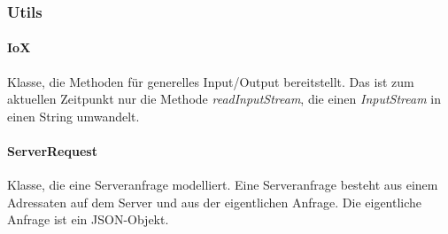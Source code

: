 \subsubsection{Utils}
\paragraph{IoX} Klasse, die Methoden für generelles Input/Output bereitstellt. Das ist zum aktuellen Zeitpunkt nur die Methode \emph{readInputStream}, die einen \emph{InputStream} in einen String umwandelt.
\paragraph{ServerRequest} Klasse, die eine Serveranfrage modelliert. Eine Serveranfrage besteht aus einem Adressaten auf dem Server und aus der eigentlichen Anfrage. Die eigentliche Anfrage ist ein JSON-Objekt.

